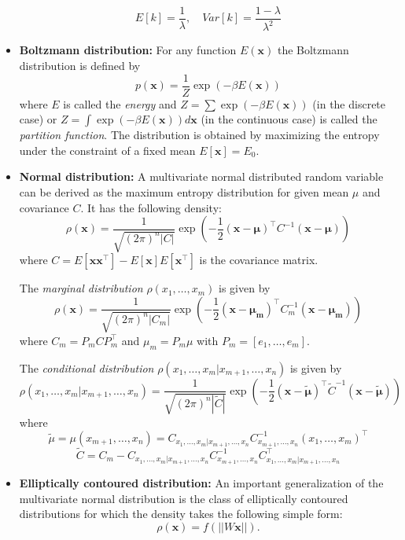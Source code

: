 \documentclass[11pt]{article}
\begin{document}
\begin{itemize}
$$
E[k] = \frac{1}{\lambda}, \quad Var[k]= \frac{1-\lambda}{\lambda^2}
$$
\item {\bf Boltzmann distribution:} For any function $E(\mathbf{x})$ the Boltzmann distribution is defined by
$$
p(\mathbf{x}) = \frac{1}{Z} \exp(-\beta E(\mathbf{x})) 
$$
where $E$ is called the {\it energy} and $Z=\sum \exp(-\beta E(\mathbf{x}))$ (in the discrete case) or  $Z=\int \exp(-\beta E(\mathbf{x})) d\mathbf{x}$ (in the continuous case) is called the {\it partition function}. The distribution is obtained by maximizing the entropy under the constraint of a fixed mean $E[\mathbf{x}] = E_0$.

\item {\bf Normal distribution:} A multivariate normal distributed random variable can be derived as the maximum entropy distribution for given mean $\mu$ and covariance $C$. It has the following density:
$$
\rho(\mathbf{x}) = \frac{1}{\sqrt{(2\pi)^n |C|}} \exp\left( -\frac{1}{2} (\mathbf{x-\mu})^\top C^{-1} (\mathbf{x-\mu}) \right)
$$
where $C=E[\mathbf{xx}^\top]- E[\mathbf{x}] E[\mathbf{x}^\top]$ is the covariance matrix. 

The {\it marginal distribution} $\rho(x_1, \dots, x_m)$ is given by
$$
\rho(\mathbf{x}) = \frac{1}{\sqrt{(2\pi)^n |C_m|}} \exp\left( -\frac{1}{2} (\mathbf{x-\mu_m})^\top C_m^{-1} (\mathbf{x-\mu_m}) \right)
$$
where $C_m = P_mCP_m^\top$ and $\mu_m = P_m \mu$ with $P_m=[e_1, \dots, e_m]$.

The {\it conditional distribution} $\rho(x_1, \dots, x_m| x_{m+1}, \dots, x_n)$ is given by
$$
\rho(x_1, \dots, x_m| x_{m+1}, \dots, x_n) = \frac{1}{\sqrt{(2\pi)^n |\tilde C|}} \exp\left( -\frac{1}{2} (\mathbf{x-\tilde \mu})^\top \tilde C^{-1}(\mathbf{x-\tilde \mu}) \right)
$$
where
$$
\tilde \mu = \mu({x_{m+1}, \dots, x_n})= C_{x_1, \dots, x_m| x_{m+1}, \dots, x_n} C_{x_{m+1}, \dots, x_n}^{-1} (x_1, \dots, x_m)^\top
$$
$$
\tilde C = C_m - C_{x_1, \dots, x_m| x_{m+1}, \dots, x_n} C_{x_{m+1}, \dots, x_n}^{-1} C_{x_1, \dots, x_m| x_{m+1}, \dots, x_n}^\top
$$

\item {\bf Elliptically contoured distribution:} An important generalization of the multivariate normal distribution is the class of elliptically contoured distributions for which the density takes the following simple form:
$$
\rho(\mathbf{x}) = f(||W\mathbf{x}||) .
$$

\end{itemize}


\vfil 
\end{document}
